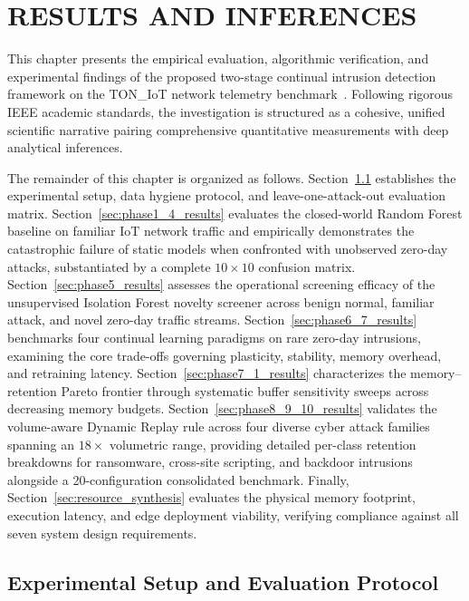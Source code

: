 \chapter{RESULTS AND INFERENCES}
\label{chap:results_and_discussion}
\label{chap:results}

This chapter presents the empirical evaluation, algorithmic verification, and experimental findings of the proposed two-stage continual intrusion detection framework on the TON\_IoT network telemetry benchmark~\cite{alshammari2020toniot}. Following rigorous IEEE academic standards, the investigation is structured as a cohesive, unified scientific narrative pairing comprehensive quantitative measurements with deep analytical inferences.

The remainder of this chapter is organized as follows. Section~\ref{sec:impl_workflow} establishes the experimental setup, data hygiene protocol, and leave-one-attack-out evaluation matrix. Section~\ref{sec:phase1_4_results} evaluates the closed-world Random Forest baseline on familiar IoT network traffic and empirically demonstrates the catastrophic failure of static models when confronted with unobserved zero-day attacks, substantiated by a complete $10 \times 10$ confusion matrix. Section~\ref{sec:phase5_results} assesses the operational screening efficacy of the unsupervised Isolation Forest novelty screener across benign normal, familiar attack, and novel zero-day traffic streams. Section~\ref{sec:phase6_7_results} benchmarks four continual learning paradigms on rare zero-day intrusions, examining the core trade-offs governing plasticity, stability, memory overhead, and retraining latency. Section~\ref{sec:phase7_1_results} characterizes the memory--retention Pareto frontier through systematic buffer sensitivity sweeps across decreasing memory budgets. Section~\ref{sec:phase8_9_10_results} validates the volume-aware Dynamic Replay rule across four diverse cyber attack families spanning an $18\times$ volumetric range, providing detailed per-class retention breakdowns for ransomware, cross-site scripting, and backdoor intrusions alongside a 20-configuration consolidated benchmark. Finally, Section~\ref{sec:resource_synthesis} evaluates the physical memory footprint, execution latency, and edge deployment viability, verifying compliance against all seven system design requirements.

\section{Experimental Setup and Evaluation Protocol}
\label{sec:impl_workflow}

